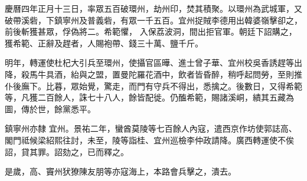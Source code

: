 \begin{pinyinscope}
 慶曆四年正月十三日，率眾五百破環州，劫州印，焚其積聚。以環州為武城軍，又破帶溪砦，下鎮寧州及普義砦，有眾一千五百。宜州捉賊李德用出韓婆嶺擊卻之，前後斬獲甚眾，俘偽將二。希範懼，
 入保荔波洞，間出拒官軍。朝廷下詔購之，獲希範、正辭及趕者，人賜袍帶、錢三十萬、鹽千斤。



 明年，轉運使杜杞大引兵至環州，使攝官區曄、進士曾子華、宜州校吳香誘趕等出降，殺馬牛具酒，紿與之盟，置曼陀羅花酒中，飲者皆昏醉，稍呼起問勞，至則推仆後廡下。比暮，眾始覺，驚走，而門有守兵不得出，悉擒之。後數日，又得希範等，凡獲二百餘人，誅七十八人，餘皆配徙。仍醢希範，賜諸溪峒，繢其五藏為圖，傳於世，餘黨悉平。



 鎮寧州亦隸
 宜州。景祐二年，蠻酋莫陵等七百餘人內寇，遣西京作坊使郭誌高、閣門祗候梁紹熙往討，未至，陵等詣桂、宜州巡檢李仲政請降。廣西轉運使不俟詔，貸其罪。詔劾之，已而釋之。



 是歲，高、竇州犾獠陳友朋等亦寇海上，本路會兵擊之，潰去。



\end{pinyinscope}